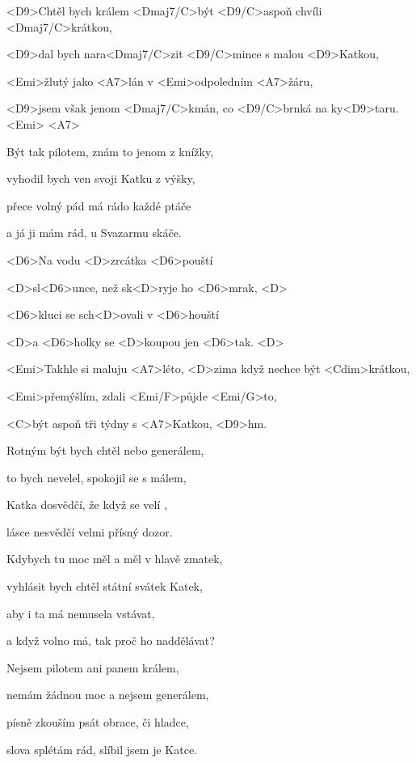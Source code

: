 

\zs
<D9>Chtěl bych králem <Dmaj7/C>být <D9/C>aspoň chvíli <Dmaj7/C>krátkou, 

<D9>dal bych nara<Dmaj7/C>zit <D9/C>mince s malou <D9>Katkou, 

<Emi>žlutý jako <A7>lán v <Emi>odpoledním <A7>žáru, 

<D9>jsem však jenom <Dmaj7/C>kmán, co <D9/C>brnká na ky<D9>taru. <Emi> <A7> \ks

\zs
Být tak pilotem, znám to jenom z knížky,

vyhodil bych ven svoji Katku z výšky,

přece volný pád má rádo každé ptáče

a já ji mám rád, u Svazarmu skáče.
\ks

\zr
<D6>Na vodu <D>zrcátka <D6>pouští

<D>sl<D6>unce, než sk<D>ryje ho <D6>mrak, <D> 

<D6>kluci se sch<D>ovali v <D6>houští 

<D>a <D6>holky se <D>koupou jen <D6>tak. <D> 

<Emi>Takhle si maluju <A7>léto, <D>zima když nechce být <Cdim>krátkou, 

<Emi>přemýšlím, zdali <Emi/F>půjde <Emi/G>to, 

<C>být aspoň tři týdny s <A7>Katkou, <D9>hm.
\kr

\zs
Rotným být bych chtěl nebo generálem, 

to bych nevelel, spokojil se s málem, 

Katka dosvědčí, že když se velí , 

lásce nesvědčí velmi přísný dozor. 
\ks

\zs
Kdybych tu moc měl a měl v hlavě zmatek, 

vyhlásit bych chtěl státní svátek Katek, 

aby i ta má nemusela vstávat,

a když volno má, tak proč ho naddělávat? 
\ks

\zr \kr

\zs
Nejsem pilotem ani panem králem, 

nemám žádnou moc a nejsem generálem, 

písně zkouším psát obrace, či hladce, 

slova splétám rád, slíbil jsem je Katce.
\ks

\kp
